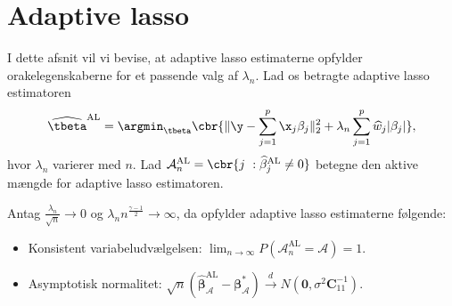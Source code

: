 \section{Adaptive lasso} \label{subsec:konsistentAL}
I dette afsnit vil vi bevise, at adaptive lasso estimaterne opfylder orakelegenskaberne for et passende valg af \(\lambda_n\). 
Lad os betragte adaptive lasso estimatoren
\begin{align*}
\widehat{\tbeta}^\text{AL} = \argmin_{\tbeta} \cbr{ \Vert \y - \sum_{j=1}^p \x_j \beta_j \Vert_2^2 + \lambda_n \sum_{j=1}^p \widehat{w}_j \vert \beta_j \vert},
\end{align*}
hvor \(\lambda_n\) varierer med \(n\).
Lad \(\mathcal{A}_n^\text{AL} = \cbr{j \ : \widehat{\beta}_j^{\text{AL}} \neq 0 }\) betegne den aktive mængde for adaptive lasso estimatoren.
%
\begin{thm}\label{thm:ALoracle}
Antag $\frac{\lambda_n}{\sqrt{n}} \rightarrow 0$ og $\lambda_n n^\frac{\gamma-1}{2} \rightarrow \infty$, da opfylder adaptive lasso estimaterne følgende:
\begin{itemize}
\item Konsistent variabeludvælgelsen: $\lim_{n \rightarrow \infty} P(\mathcal{A}_n^\text{AL}=\mathcal{A})=1$.
\item Asymptotisk normalitet: $\sqrt{n}\left( \widehat{\boldsymbol{\beta}}_\mathcal{A}^{\text{AL}}-\boldsymbol{\beta}_\mathcal{A}^* \right) \overset{d}{\rightarrow} N(\textbf{0},\sigma^2 \boldsymbol{C}_{11}^{-1}).$
\end{itemize} 
\end{thm}
%
